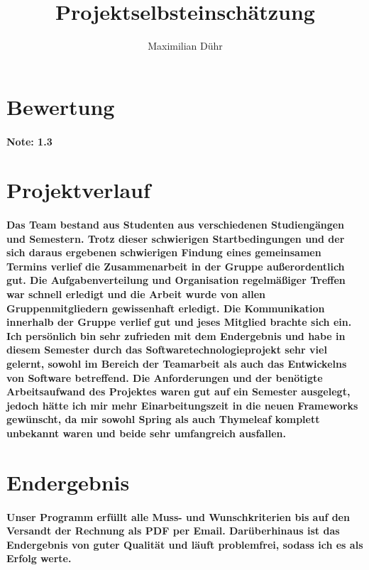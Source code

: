 \documentclass[a4paper]{article}
\author{Maximilian Dühr}
\date{}
\title{
\normalfont
\normalsize
\huge{Projektselbsteinschätzung}
}
\begin{document}
\maketitle


\newpage

\section*{Bewertung}
\paragraph{Note: 1.3}

\section*{Projektverlauf}
\paragraph{Das Team bestand aus Studenten aus verschiedenen Studiengängen und Semestern. Trotz dieser schwierigen Startbedingungen und der sich daraus ergebenen schwierigen Findung eines gemeinsamen Termins verlief die Zusammenarbeit in der Gruppe außerordentlich gut. Die Aufgabenverteilung und Organisation regelmäßiger Treffen war schnell erledigt und die Arbeit wurde von allen Gruppenmitgliedern gewissenhaft erledigt. Die Kommunikation innerhalb der Gruppe verlief gut und jeses Mitglied brachte sich ein. Ich persönlich bin sehr zufrieden mit dem Endergebnis und  habe in diesem Semester durch das Softwaretechnologieprojekt sehr viel gelernt, sowohl im Bereich der Teamarbeit als auch das Entwickelns von Software betreffend. Die Anforderungen und der benötigte Arbeitsaufwand des Projektes waren gut auf ein Semester ausgelegt, jedoch hätte ich mir mehr Einarbeitungszeit in die neuen Frameworks gewünscht, da mir sowohl Spring als auch Thymeleaf komplett unbekannt waren und beide sehr umfangreich ausfallen.}

\section*{Endergebnis}
\paragraph{Unser Programm erfüllt alle Muss- und Wunschkriterien bis auf den Versandt der Rechnung als PDF per Email. Darüberhinaus ist das Endergebnis von guter Qualität und läuft problemfrei, sodass ich es als Erfolg werte.}
\end{document}
